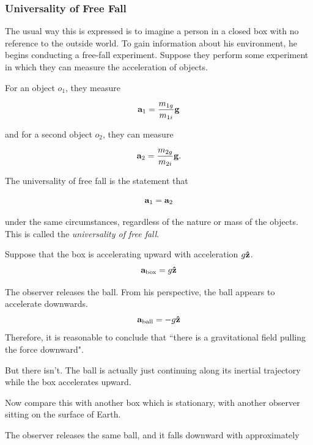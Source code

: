 	\subsubsection{Universality of Free Fall}

		The usual way this is expressed is to imagine a person in a closed box with no reference to the outside world. To gain 
		information about his environment, he begins conducting a free-fall experiment. Suppose they perform some experiment in 
		which they can measure the acceleration of objects.

		For an object $o_1$, they measure

		\begin{equation}
			\vb{a}_1 = \frac{m_{1g}}{m_{1i}} \vb{g}
		\end{equation}

		and for a second object $o_2$, they can measure

		\begin{equation}
			\vb{a}_2 = \frac{m_{2g}}{m_{2i}} \vb{g}.
		\end{equation}

		The universality of free fall is the statement that

		\begin{equation}
			\vb{a}_1 = \vb{a}_2
		\end{equation}

		under the same circumstances, regardless of the nature or mass of the objects. This is called the \textit{universality of free fall}.
		
		Suppose that the box is accelerating upward with acceleration $g\vu{z}$.
		\begin{equation}
			\vb{a}_\text{box} = g\vu{z}
		\end{equation}

		The observer releases the ball. From his perspective, the ball appears to accelerate downwards.
		\begin{equation}
			\vb{a}_\text{ball} = -g\vu{z}
		\end{equation}
		Therefore, it is reasonable to conclude that ``there is a gravitational field pulling the force downward".

		But there isn't. The ball is actually just continuing along its inertial trajectory while the box accelerates upward.

		Now compare this with another box which is stationary, with another observer sitting on the surface of Earth.

		The observer releases the same ball, and it falls downward with approximately

